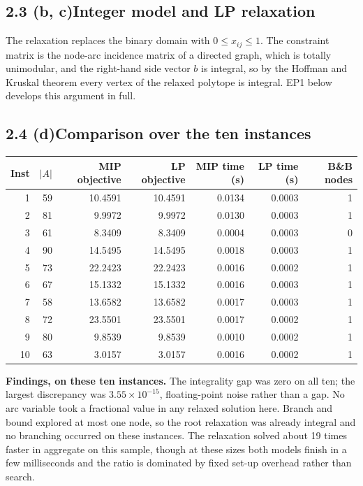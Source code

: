 \documentclass[11pt]{article}
\begin{document}
\subsection*{2.3 (b, c)\quad Integer model and LP relaxation}

The relaxation replaces the binary domain with $0 \le x_{ij} \le 1$. The
constraint matrix is the node-arc incidence matrix of a directed graph,
which is totally unimodular, and the right-hand side vector $b$ is
integral, so by the Hoffman and Kruskal theorem every vertex of the
relaxed polytope is integral. EP1 below develops this argument in full.

\subsection*{2.4 (d)\quad Comparison over the ten instances}

\begin{center}
\small
\begin{tabular}{@{}rrrrrrr@{}}
\toprule
Inst & $|A|$ & MIP objective & LP objective & MIP time (s) & LP time (s) & B\&B nodes \\
\midrule
1  & 59 & 10.4591 & 10.4591 & 0.0134 & 0.0003 & 1 \\
2  & 81 &  9.9972 &  9.9972 & 0.0130 & 0.0003 & 1 \\
3  & 61 &  8.3409 &  8.3409 & 0.0004 & 0.0003 & 0 \\
4  & 90 & 14.5495 & 14.5495 & 0.0018 & 0.0003 & 1 \\
5  & 73 & 22.2423 & 22.2423 & 0.0016 & 0.0002 & 1 \\
6  & 67 & 15.1332 & 15.1332 & 0.0016 & 0.0003 & 1 \\
7  & 58 & 13.6582 & 13.6582 & 0.0017 & 0.0003 & 1 \\
8  & 72 & 23.5501 & 23.5501 & 0.0017 & 0.0002 & 1 \\
9  & 80 &  9.8539 &  9.8539 & 0.0010 & 0.0002 & 1 \\
10 & 63 &  3.0157 &  3.0157 & 0.0016 & 0.0002 & 1 \\
\bottomrule
\end{tabular}
\end{center}

\textbf{Findings, on these ten instances.}\quad
The integrality gap was zero on all ten; the largest discrepancy was
$3.55 \times 10^{-15}$, floating-point noise rather than a gap. No arc
variable took a fractional value in any relaxed solution here. Branch
and bound explored at most one node, so the root relaxation was already
integral and no branching occurred on these instances. The relaxation
solved about 19 times faster in aggregate on this sample, though at
these sizes both models finish in a few milliseconds and the ratio is
dominated by fixed set-up overhead rather than search.
\end{document}
